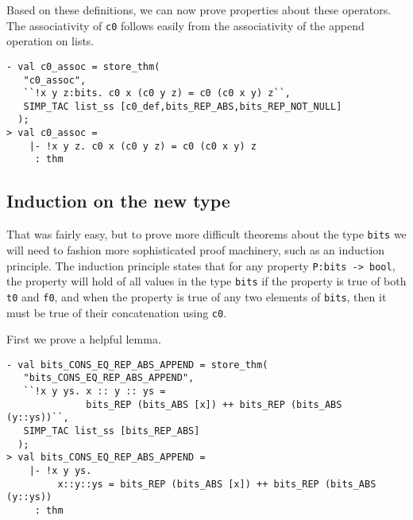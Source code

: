 Based on these definitions, we can now prove properties about these operators.
The associativity of \texttt{c0} follows easily
from the associativity of the append operation on lists.
%
\begin{session}
\begin{verbatim}
- val c0_assoc = store_thm(
   "c0_assoc",
   ``!x y z:bits. c0 x (c0 y z) = c0 (c0 x y) z``,
   SIMP_TAC list_ss [c0_def,bits_REP_ABS,bits_REP_NOT_NULL]
  );
> val c0_assoc =
    |- !x y z. c0 x (c0 y z) = c0 (c0 x y) z
     : thm
\end{verbatim}
\end{session}

\subsection{Induction on the new type}

That was fairly easy, but
to prove more difficult theorems about the type \texttt{bits} we
will need
to fashion more sophisticated proof machinery,
such as 
an induction principle.
The induction principle
states that for any property \texttt{P:bits -> bool},
the property will hold of all values in the type \texttt{bits} if the property
is true of both \texttt{t0} and \texttt{f0}, and when the property is true of any
two elements of \texttt{bits}, then it must be true of their concatenation using
\texttt{c0}.

First we prove a helpful lemma.
%
\begin{session}
\begin{verbatim}
- val bits_CONS_EQ_REP_ABS_APPEND = store_thm(
   "bits_CONS_EQ_REP_ABS_APPEND",
   ``!x y ys. x :: y :: ys =
              bits_REP (bits_ABS [x]) ++ bits_REP (bits_ABS (y::ys))``,
   SIMP_TAC list_ss [bits_REP_ABS]
  );
> val bits_CONS_EQ_REP_ABS_APPEND =
    |- !x y ys.
         x::y::ys = bits_REP (bits_ABS [x]) ++ bits_REP (bits_ABS (y::ys))
     : thm
\end{verbatim}
\end{session}

